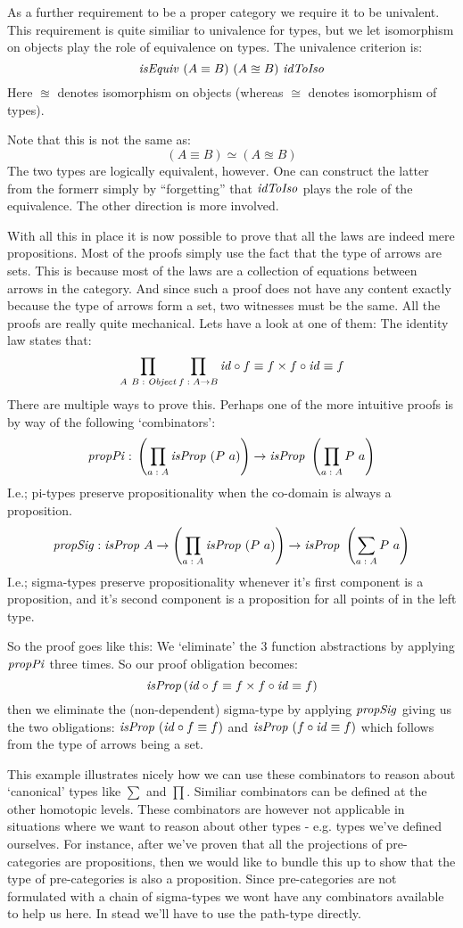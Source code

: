 As a further requirement to be a proper category we require it to be univalent.
This requirement is quite similiar to univalence for types, but we let
isomorphism on objects play the role of equivalence on types. The univalence
criterion is:
%
$$
\mathit{isEquiv}\ (A \equiv B)\ (A \approxeq B)\ \mathit{idToIso}
$$
%
Here $\approxeq$ denotes isomorphism on objects (whereas $\cong$ denotes
isomorphism of types).

Note that this is not the same as:
%
$$
(A \equiv B) \simeq (A \approxeq B)
$$
%
The two types are logically equivalent, however. One can construct the latter
from the formerr simply by ``forgetting'' that $\mathit{idToIso}$ plays the role
of the equivalence. The other direction is more involved.

With all this in place it is now possible to prove that all the laws are indeed
mere propositions. Most of the proofs simply use the fact that the type of
arrows are sets. This is because most of the laws are a collection of equations
between arrows in the category. And since such a proof does not have any content
exactly because the type of arrows form a set, two witnesses must be the same.
All the proofs are really quite mechanical. Lets have a look at one of them: The
identity law states that:
%
$$
\prod_{A\ B \;\mathord{:}\; \mathit{Object}} \prod_{f \;\mathord{:}\; A \to B} \mathit{id} \circ f \equiv f \times f \circ \mathit{id} \equiv f
$$
%
There are multiple ways to prove this. Perhaps one of the more intuitive proofs
is by way of the following `combinators':
%
$$
\mathit{propPi} \tp \left(\prod_{a \tp A} \isProp\ (P\ a)\right) \to \isProp\ \left(\prod_{a \tp A} P\ a\right)
$$
%
I.e.; pi-types preserve propositionality when the co-domain is always a
proposition.
%
$$
\mathit{propSig} \;\mathord{:}\; \mathit{isProp}\ A \to \left(\prod_{a \;\mathord{:}\; A} \mathit{isProp}\ (P\ a)\right) \to \mathit{isProp}\ \left(\sum_{a \;\mathord{:}\; A} P\ a\right)
$$
%
I.e.; sigma-types preserve propositionality whenever it's first component is a
proposition, and it's second component is a proposition for all points of in the
left type.

So the proof goes like this: We `eliminate' the 3 function abstractions by
applying $\mathit{propPi}$ three times. So our proof obligation becomes:
%
$$
\mathit{isProp} \left( \mathit{id} \circ f \equiv f \times f \circ \mathit{id} \equiv f \right)
$$
%
then we eliminate the (non-dependent) sigma-type by applying $\mathit{propSig}$ giving
us the two obligations: $\mathit{isProp}\ (\mathit{id} \circ f \equiv f)$ and $\mathit{isProp}\ (f \circ
\mathit{id} \equiv f)$ which follows from the type of arrows being a set.

This example illustrates nicely how we can use these combinators to reason about
`canonical' types like $\sum$ and $\prod$. Similiar combinators can be defined
at the other homotopic levels. These combinators are however not applicable in
situations where we want to reason about other types - e.g. types we've defined
ourselves. For instance, after we've proven that all the projections of
pre-categories are propositions, then we would like to bundle this up to show
that the type of pre-categories is also a proposition. Since pre-categories are
not formulated with a chain of sigma-types we wont have any combinators
available to help us here. In stead we'll have to use the path-type directly.

